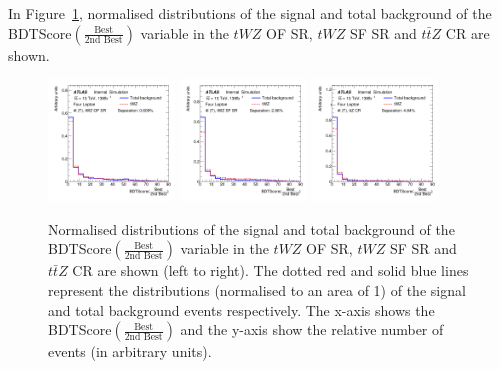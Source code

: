 In Figure~\ref{fig:bdtscore-bestover2ndbest}, normalised distributions of the signal and total background of the BDTScore$(\frac{\text{Best}}{\text{2nd Best}})$ variable in the $tWZ$ OF SR, $tWZ$ SF SR and $t\bar{t}Z$ CR are shown.
\begin{figure}
    \centering
    \includegraphics[width=0.3\textwidth]{figures/bdtPlots/lep4_tWZ_4T_OF_BDT_Score_bestOver2ndBest_noExclusion.png}
    \includegraphics[width=0.3\textwidth]{figures/bdtPlots/lep4_tWZ_4T_SF_BDT_Score_bestOver2ndBest_noExclusion.png}
    \includegraphics[width=0.3\textwidth]{figures/bdtPlots/lep4_ttZ_4T_BDT_Score_bestOver2ndBest_noExclusion.png}
    \caption{Normalised distributions of the signal and total background of the BDTScore$(\frac{\text{Best}}{\text{2nd Best}})$ variable in the $tWZ$ OF SR, $tWZ$ SF SR and $t\bar{t}Z$ CR are shown (left to right). The dotted red and solid blue lines represent the distributions (normalised to an area of 1) of the signal and total background events respectively. The x-axis shows the BDTScore$(\frac{\text{Best}}{\text{2nd Best}})$ and the y-axis show the relative number of events (in arbitrary units).}
    \label{fig:bdtscore-bestover2ndbest}
\end{figure}

